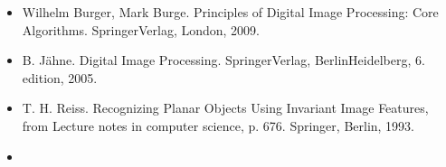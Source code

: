 \documentclass[letterpaper,10pt,english]{sphinxmanual}
\begin{document}
\begin{itemize}
\begin{itemize}
\item {} 
\sphinxAtStartPar
Wilhelm Burger, Mark Burge. Principles of Digital Image Processing: Core Algorithms. Springer\sphinxhyphen{}Verlag, London, 2009.

\item {} 
\sphinxAtStartPar
B. Jähne. Digital Image Processing. Springer\sphinxhyphen{}Verlag,
Berlin\sphinxhyphen{}Heidelberg, 6. edition, 2005.

\item {} 
\sphinxAtStartPar
T. H. Reiss. Recognizing Planar Objects Using Invariant Image
Features, from Lecture notes in computer science, p. 676. Springer,
Berlin, 1993.

\item {} 
\sphinxAtStartPar
{}

\end{itemize}

\end{itemize}
\end{document}
